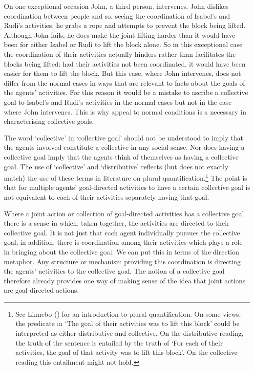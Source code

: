 \documentclass[12pt,a4paper]{extarticle}
\begin{document}
On one exceptional occasion John, a third person, intervenes.  John dislikes coordination between people and so, seeing the coordination of Isabel's and Rudi's activities, he grabs a rope and attempts to prevent the block being lifted.  Although John fails, he does make the joint lifting harder than it would have been for either Isabel or Rudi to lift the block alone.  
So in this exceptional case the coordination of their activities actually hinders rather than facilitates the blocks being lifted:
had their activities not been coordinated, it would have been easier for them to lift the block.
But this case, where John intervenes, does not differ from the normal cases in ways that are relevant to facts about the goals of the agents' activities.  
For this reason it would be a mistake to ascribe a collective goal to Isabel's and Rudi's activities in the normal cases but not in the case where John intervenes. 
This is why appeal to normal conditions is a necessary in characterising collective goals.



The word `collective' in `collective goal' should not be understood to imply that the agents  involved constitute a collective in any social sense.  Nor does having a collective goal imply that the agents think of themselves as having a collective goal.  The use of `collective' and `distributive' reflects  (but does not exactly match) the use of these terms in literature on plural quantification.\footnote{
See Linnebo (\citeyear{Linnebo:2005ig}) for an introduction to plural quantification.  On some views, the predicate in `The goal of their activities was to lift this block' could be interpreted as either distributive and collective.  On the distributive reading, the truth of the sentence is entailed by the truth of `For each of their activities, the goal of that activity was to lift this block'.  On the collective reading this entailment might not hold.
}
The point is that for multiple agents' goal-directed activities to have a certain collective goal is not equivalent to each of their activities separately having that goal.


Where a joint action or collection of goal-directed activities has a collective goal there is a sense in which, taken together, the activities are directed to their collective goal.  It is not just that each agent individually pursues the collective goal; in addition, there is coordination among their activities which plays a role in bringing about the collective goal.  We can put this in terms of the direction metaphor.  Any structure or mechanism providing this coordination is directing the agents' activities to the collective goal.  The notion of a collective goal therefore already provides one way of making sense of the idea that joint actions are goal-directed actions.
\end{document}
